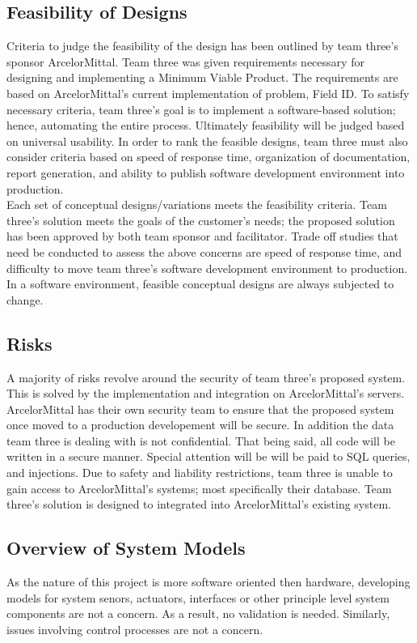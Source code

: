 \documentclass[Letter,11pt]{article}
\begin{document}
	\subsection{Feasibility of Designs}
	Criteria to judge the feasibility of the design has been outlined by team three's sponsor ArcelorMittal. Team three was given requirements necessary for designing and implementing a Minimum Viable Product. The requirements are based on ArcelorMittal's current implementation of problem, Field ID. To satisfy necessary criteria, team three's goal is to implement a software-based solution; hence, automating the entire process. Ultimately feasibility will be judged based on universal usability. In order to rank the feasible designs, team three must also consider criteria based on speed of response time, organization of documentation, report generation, and ability to publish software development environment into production. \\
	Each set of conceptual designs/variations meets the feasibility criteria. Team three's solution meets the goals of the customer's needs; the proposed solution has been approved by both team sponsor and facilitator. Trade off studies that need be conducted to assess the above concerns are speed of response time, and difficulty to move team three's software development environment to production. In a software environment, feasible conceptual designs are always subjected to change. \\
	\subsection{Risks}
	A majority of risks revolve around the security of team three's proposed system. This is solved by the implementation and integration on ArcelorMittal's servers. ArcelorMittal has their own security team to ensure that the proposed system once moved to a production developement will be secure. In addition the data team three is dealing with is not confidential. That being said, all code will be written in a secure manner. Special attention will be will be paid to SQL  queries, and injections.  Due to safety and liability restrictions, team three is unable to gain access to ArcelorMittal's systems; most specifically their database. Team three's solution is designed to integrated into ArcelorMittal's existing system. \\
	
	\subsection{Overview of System Models}
	As the nature of this project is more software oriented then hardware, developing models for system senors, actuators, interfaces or other principle level system components are not a concern. As a result, no validation is needed. Similarly, issues involving control processes are not a concern. \\
	
\end{document}
